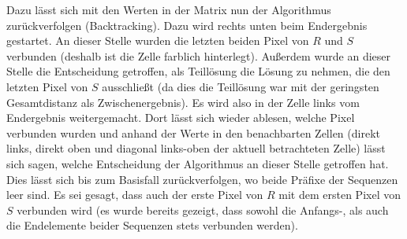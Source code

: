 \documentclass{whswinvcbook}
\begin{document}
Dazu lässt sich mit den Werten in der Matrix nun der Algorithmus zurückverfolgen (Backtracking). Dazu wird rechts unten beim Endergebnis gestartet. An dieser Stelle wurden die letzten beiden Pixel von $R$ und $S$ verbunden (deshalb ist die Zelle farblich hinterlegt). Außerdem wurde an dieser Stelle die Entscheidung getroffen, als Teillösung die Lösung zu nehmen, die den letzten Pixel von $S$ ausschließt (da dies die Teillösung war mit der geringsten Gesamtdistanz als Zwischenergebnis). Es wird also in der Zelle links vom Endergebnis weitergemacht. Dort lässt sich wieder ablesen, welche Pixel verbunden wurden und anhand der Werte in den benachbarten Zellen (direkt links, direkt oben und diagonal links-oben der aktuell betrachteten Zelle) lässt sich sagen, welche Entscheidung der Algorithmus an dieser Stelle getroffen hat. Dies lässt sich bis zum Basisfall zurückverfolgen, wo beide Präfixe der Sequenzen leer sind. Es sei gesagt, dass auch der erste Pixel von $R$ mit dem ersten Pixel von $S$ verbunden wird (es wurde bereits gezeigt, dass sowohl die Anfangs-, als auch die Endelemente beider Sequenzen stets verbunden werden).
\end{document}
